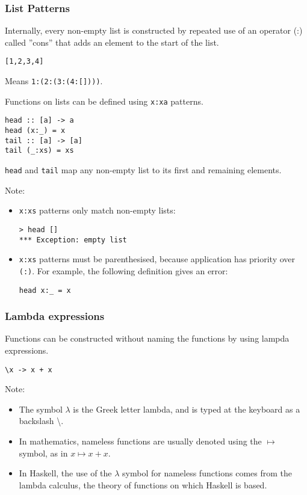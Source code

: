 \begin{multicols}{2}
\subsubsection{List Patterns}
Internally, every non-empty list is constructed by repeated use of an operator (:) called ''cons'' that adds an element to the start of the list.
\begin{lstlisting}
[1,2,3,4]
\end{lstlisting}
Means \lstinline{1:(2:(3:(4:[])))}.

Functions on lists can be defined using \lstinline{x:xa} patterns.
\begin{lstlisting}
head :: [a] -> a
head (x:_) = x
tail :: [a] -> [a]
tail (_:xs) = xs
\end{lstlisting}
\lstinline{head} and \lstinline{tail} map any non-empty list to its first and remaining elements.

Note:
\begin{itemize}
  \item \lstinline{x:xs} patterns only match non-empty lists:
\begin{lstlisting}
> head []
*** Exception: empty list
\end{lstlisting}
  \item \lstinline{x:xs} patterns must be parenthesised, because application has priority over \lstinline{(:)}. For example, the following definition gives an error:
\begin{lstlisting}
head x:_ = x
\end{lstlisting}
\end{itemize}

\subsubsection{Lambda expressions}
Functions can be constructed without naming the functions by using lampda expressions.
\begin{lstlisting}
\x -> x + x
\end{lstlisting}
Note:
\begin{itemize}
  \item The symbol $\lambda$ is the Greek letter lambda, and is typed at the keyboard as a backslash \textbackslash.
  \item In mathematics, nameless functions are usually denoted using the $\mapsto$ symbol, as in $x \mapsto x + x$.
  \item In Haskell, the use of the $\lambda$ symbol for nameless functions comes from the lambda calculus, the theory of functions on which Haskell is based.
\end{itemize}


\end{multicols}
